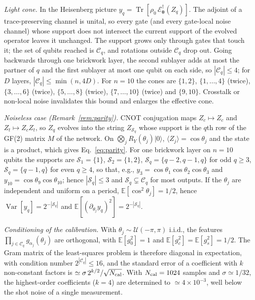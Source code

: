\documentclass[floatfix,aps,pra,twocolumn,superscriptaddress,10pt,nofootinbib]{revtex4-2}
\begin{document}
\begin{appendices}
\emph{Light cone.} In the Heisenberg picture $y_q=\operatorname{Tr}[\rho_0\,\mathcal E^\dagger_{\bm\theta}(Z_q)]$. The adjoint of a trace-preserving channel is unital, so every gate (and every gate-local noise channel) whose support does not intersect the current support of the evolved operator leaves it unchanged. The support grows only through gates that touch it; the set of qubits reached is $\mathcal C_q$, and rotations outside $\mathcal C_q$ drop out. Going backwards through one brickwork layer, the second sublayer adds at most the partner of $q$ and the first sublayer at most one qubit on each side, so $|\mathcal C_q|\le4$; for $D$ layers, $|\mathcal C_q|\le\min(n,4D)$. For $n=10$ the cones are $\{1,2\}$, $\{1,\dots,4\}$ (twice), $\{3,\dots,6\}$ (twice), $\{5,\dots,8\}$ (twice), $\{7,\dots,10\}$ (twice) and $\{9,10\}$. Crosstalk or non-local noise invalidates this bound and enlarges the effective cone.

\emph{Noiseless case (Remark~\ref{rem:parity}).} CNOT conjugation maps $Z_c\mapsto Z_c$ and $Z_t\mapsto Z_cZ_t$, so $Z_q$ evolves into the string $Z_{\mathcal S_q}$ whose support is the $q$th row of the GF(2) matrix $M$ of the network. On $\bigotimes_jR_Y(\theta_j)|0\rangle$, $\langle Z_j\rangle=\cos\theta_j$ and the state is a product, which gives Eq.~\eqref{eq:parity}. For one brickwork layer on $n=10$ qubits the supports are $\mathcal S_1=\{1\}$, $\mathcal S_2=\{1,2\}$, $\mathcal S_{q}=\{q-2,q-1,q\}$ for odd $q\ge3$, $\mathcal S_q=\{q-1,q\}$ for even $q\ge4$, so that, e.g., $y_3=\cos\theta_1\cos\theta_2\cos\theta_3$ and $y_{10}=\cos\theta_9\cos\theta_{10}$; hence $|\mathcal S_q|\le3$ and $\mathcal S_q\subsetneq\mathcal C_q$ for most outputs. If the $\theta_j$ are independent and uniform on a period, $\mathbb E[\cos^2\theta_j]=1/2$, hence $\operatorname{Var}[y_q]=2^{-|\mathcal S_q|}$ and $\mathbb E[(\partial_{\theta_j}y_q)^2]=2^{-|\mathcal S_q|}$.

\emph{Conditioning of the calibration.} With $\theta_j\sim\mathcal U(-\pi,\pi)$ i.i.d., the features $\prod_{j\in\mathcal C_q}g_{\alpha_j}(\theta_j)$ are orthogonal, with $\mathbb E[g_0^2]=1$ and $\mathbb E[g_c^2]=\mathbb E[g_s^2]=1/2$. The Gram matrix of the least-squares problem is therefore diagonal in expectation, with condition number $2^{|\mathcal C_q|}\le16$, and the standard error of a coefficient with $k$ non-constant factors is $\simeq\sigma\,2^{k/2}/\sqrt{N_{\rm cal}}$. With $N_{\rm cal}=1024$ samples and $\sigma\simeq1/32$, the highest-order coefficients ($k=4$) are determined to $\simeq4\times10^{-3}$, well below the shot noise of a single measurement.


\end{appendices}
\end{document}
